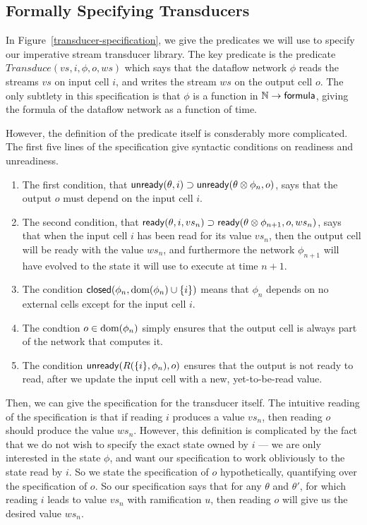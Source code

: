 \subsection{Formally Specifying Transducers}

In Figure~\ref{transducer-specification}, we give the predicates we
will use to specify our imperative stream transducer library. The key
predicate is the predicate $\mathit{Transduce}(vs, i, \phi, o, ws)$
which says that the dataflow network $\phi$ reads the streams $vs$ on
input cell $i$, and writes the stream $ws$ on the output cell $o$. The
only subtlety in this specification is that $\phi$ is a function in
$\mathbb{N} \to \mathsf{formula}$, giving the formula of the dataflow network
as a function of time.

However, the definition of the predicate itself is consderably more
complicated. The first five lines of the specification give syntactic
conditions on readiness and unreadiness. 
\begin{enumerate}
\item The first condition, that $\mathsf{unready}({\theta}, {i}) \supset
\mathsf{unready}({\theta \otimes \phi_n}, {o})$, says that the output $o$ must
depend on the input cell $i$.

\item The second condition, that $\mathsf{ready}({\theta}, {i}, {vs_n}) \supset
  \mathsf{ready}({\theta \otimes \phi_{n+1}}, {o}, {ws_n})$, says that when the
  input cell $i$ has been read for its value $vs_n$, then the output
  cell will be ready with the value $ws_n$, and furthermore the
  network $\phi_{n+1}$ will have evolved to the state it will use to
  execute at time $n + 1$.

\item The condition $\mathsf{closed}({\phi_n}, {\mbox{dom}({\phi_n}) \cup \{{i}\}})$
means that $\phi_n$ depends on no external cells except for the input
cell $i$. 

\item The condtion $o \in \mbox{dom}({\phi_n})$ simply ensures that the
output cell is always part of the network that computes it. 

\item The condition $\mathsf{unready}({R(\{{i}\}, \phi_n)}, {o})$ ensures
that the output is not ready to read, after we update the input
cell with a new, yet-to-be-read value. 
\end{enumerate}

Then, we can give the specification for the transducer itself.  The
intuitive reading of the specification is that if reading $i$ produces
a value $vs_n$, then reading $o$ should produce the value
$ws_n$. However, this definition is complicated by the fact that we do
not wish to specify the exact state owned by $i$ --- we are only
interested in the state $\phi$, and want our specification to work
obliviously to the state read by $i$. So we state the specification of
$o$ hypothetically, quantifying over the specification of $o$. So our
specification says that for any $\theta$ and $\theta'$, for which
reading $i$ leads to value $vs_n$ with ramification $u$, then reading
$o$ will give us the desired value $ws_n$. 

